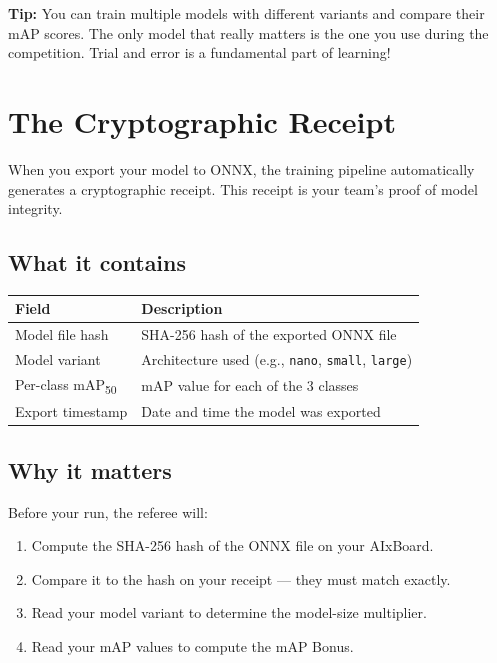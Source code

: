 \documentclass[a4]{article}
\begin{document}
\begin{framed}
\textbf{Tip:} You can train multiple models with different variants and compare their mAP scores. The only model that really matters is the one you use during the competition. Trial and error is a fundamental part of learning!
\end{framed}

\pagebreak
\section*{The Cryptographic Receipt}

When you export your model to ONNX, the training pipeline automatically generates a cryptographic receipt. This receipt is your team's proof of model integrity.

\subsection*{What it contains}

\begin{table}[H]
\centering
\begin{tabular}{ll}
\toprule
\textbf{Field} & \textbf{Description} \\
\midrule
Model file hash & SHA-256 hash of the exported ONNX file \\
Model variant & Architecture used (e.g., \texttt{nano}, \texttt{small}, \texttt{large}) \\
Per-class mAP\textsubscript{50} & mAP value for each of the 3 classes \\
Export timestamp & Date and time the model was exported \\
\bottomrule
\end{tabular}
\end{table}

\subsection*{Why it matters}

Before your run, the referee will:
\begin{enumerate}
    \item Compute the SHA-256 hash of the ONNX file on your AIxBoard.
    \item Compare it to the hash on your receipt --- they must match exactly.
    \item Read your model variant to determine the model-size multiplier.
    \item Read your mAP values to compute the mAP Bonus.
\end{enumerate}
\end{document}
